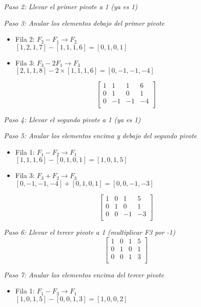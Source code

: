 \documentclass[12pt]{article}
\begin{document}
\textit{Paso 2: Llevar el primer pivote a 1 (ya es 1)}

\textit{Paso 3: Anular los elementos debajo del primer pivote}
\begin{itemize}
    \item Fila 2: $F_2 - F_1 \rightarrow F_2$ \\
    $[1, 2, 1, 7] - [1, 1, 1, 6] = [0, 1, 0, 1]$
    \item Fila 3: $F_3 - 2F_1 \rightarrow F_3$ \\
    $[2, 1, 1, 8] - 2 \times [1, 1, 1, 6] = [0, -1, -1, -4]$
\end{itemize}

\[
\left[
\begin{array}{ccc|c}
1 & 1 & 1 & 6 \\
0 & 1 & 0 & 1 \\
0 & -1 & -1 & -4 \\
\end{array}
\right]
\]

\textit{Paso 4: Llevar el segundo pivote a 1 (ya es 1)}

\textit{Paso 5: Anular los elementos encima y debajo del segundo pivote}
\begin{itemize}
    \item Fila 1: $F_1 - F_2 \rightarrow F_1$ \\
    $[1, 1, 1, 6] - [0, 1, 0, 1] = [1, 0, 1, 5]$
    \item Fila 3: $F_3 + F_2 \rightarrow F_3$ \\
    $[0, -1, -1, -4] + [0, 1, 0, 1] = [0, 0, -1, -3]$
\end{itemize}

\[
\left[
\begin{array}{ccc|c}
1 & 0 & 1 & 5 \\
0 & 1 & 0 & 1 \\
0 & 0 & -1 & -3 \\
\end{array}
\right]
\]

\textit{Paso 6: Llevar el tercer pivote a 1 (multiplicar F3 por -1)}
\[
\left[
\begin{array}{ccc|c}
1 & 0 & 1 & 5 \\
0 & 1 & 0 & 1 \\
0 & 0 & 1 & 3 \\
\end{array}
\right]
\]

\textit{Paso 7: Anular los elementos encima del tercer pivote}
\begin{itemize}
    \item Fila 1: $F_1 - F_3 \rightarrow F_1$ \\
    $[1, 0, 1, 5] - [0, 0, 1, 3] = [1, 0, 0, 2]$
\end{itemize}
\end{document}
